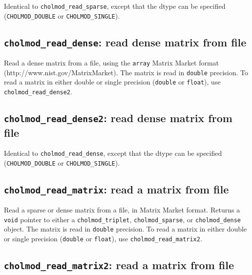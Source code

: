 \documentclass[11pt]{article}
\begin{document}

Identical to \verb'cholmod_read_sparse', except that the dtype can be
specified (\verb'CHOLMOD_DOUBLE' or \verb'CHOLMOD_SINGLE').

\subsection{{\tt cholmod\_read\_dense}: read dense matrix from file}


Read a dense matrix from a file, using the {\tt array} Matrix Market format
\newline (http://www.nist.gov/MatrixMarket).
%
The matrix is read in {\tt double} precision.  To read a matrix
in either double or single precision ({\tt double} or {\tt float}),
use \verb'cholmod_read_dense2'.

\subsection{{\tt cholmod\_read\_dense2}: read dense matrix from file}


Identical to \verb'cholmod_read_dense', except that the dtype can be
specified (\verb'CHOLMOD_DOUBLE' or \verb'CHOLMOD_SINGLE').

\subsection{{\tt cholmod\_read\_matrix}: read a matrix from file}


Read a sparse or dense matrix from a file, in Matrix Market format.  Returns a
{\tt void} pointer to either a {\tt cholmod\_triplet}, {\tt cholmod\_sparse},
or {\tt cholmod\_dense} object.
%
The matrix is read in {\tt double} precision.  To read a matrix
in either double or single precision ({\tt double} or {\tt float}),
use \verb'cholmod_read_matrix2'.

\subsection{{\tt cholmod\_read\_matrix2}: read a matrix from file}
\end{document}
